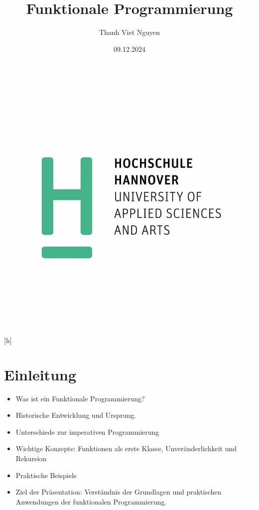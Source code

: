 \documentclass{beamer}
\title{Funktionale Programmierung}
\author{Thanh Viet Nguyen}
\begin{document}
\begin{frame}%
    \maketitle
    \centering
 \includegraphics[scale=0.15]{bilder/hsh-logo.jpg}[h]
   \date{09.12.2024}

\end{frame}

\begin{frame}
	\tableofcontents
\end{frame}


\section{Einleitung}
\begin{frame}
\begin{itemize}
\item Was ist ein Funktionale Programmierung?
\item Historische Entwicklung und Ursprung.
\item Unterschiede zur imperativen Programmierung
\item Wichtige Konzepte: Funktionen als erste Klasse, Unveränderlichkeit und Rekursion
\item Praktische Beispiele
\item Ziel der Präsentation: Verständnis der Grundlagen und praktischen Anwendungen der funktionalen Programmierung.

\end{itemize}
\end{frame}
\end{document}
